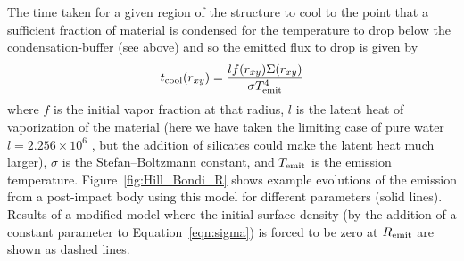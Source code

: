 \documentclass[sn-nature]{sn-jnl}%
\begin{document}
%
The time taken for a given region of the structure to cool to the point that a sufficient fraction of material is condensed for the temperature to drop below the condensation-buffer (see above) and so the emitted flux to drop is given by
%
\begin{equation}
    t_{\rm cool} (r_{xy})=\frac{l f(r_{xy}) \Sigma(r_{xy})}{\sigma T^4_{\rm emit}}
\end{equation}
%
where $f$ is the initial vapor fraction at that radius, $l$ is the latent heat of vaporization of the material (here we have taken the limiting case of pure water $l=2.256\times 10^6$ \cite{Chase1998}, but the addition of silicates could make the latent heat much larger), $\sigma$ is the Stefan–Boltzmann constant, and $T_{\rm emit}$ is the emission temperature. Figure~\ref{fig:Hill_Bondi_R} shows example evolutions of the emission from a post-impact body using this model for different parameters (solid lines). Results of a modified model where the initial surface density (by the addition of a constant parameter to Equation~\ref{eqn:sigma}) is forced to be zero at $R_{\rm emit}$ are shown as dashed lines.




\clearpage

\makeatletter
\apptocmd{\thebibliography}{\global\c@NAT@ctr 30\relax}{}{}
\makeatother
\end{document}
